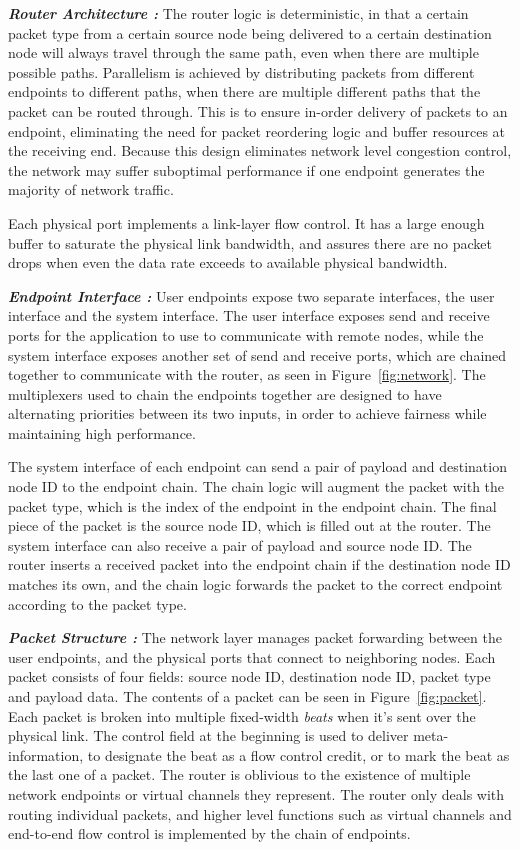 \emph{\bf{Router Architecture :}}
The router logic is deterministic, in that a certain packet type from a certain
source node being delivered to a certain destination node will always travel
through the same path, even when there are multiple possible paths. Parallelism
is achieved by distributing packets from different endpoints to different paths,
when there are multiple different paths that the packet can be routed through.
This is to ensure in-order delivery of packets to an endpoint, eliminating the
need for packet reordering logic and buffer resources at the receiving end.
Because this design eliminates network level congestion control, the network may
suffer suboptimal performance if one endpoint generates the majority of network
traffic.

Each physical port implements a link-layer flow control. It has a large enough
buffer to saturate the physical link bandwidth, and assures there are no packet
drops when even the data rate exceeds to available physical bandwidth.

\emph{\bf{Endpoint Interface :}}
User endpoints expose two
separate interfaces, the user interface and the system interface. The user
interface exposes send and receive ports for the application to use to
communicate with remote nodes, while the system interface exposes another set of send
and receive ports, which are chained together to communicate with the router, as
seen in Figure~\ref{fig:network}.
The multiplexers used to chain the
endpoints together are designed to have alternating priorities between its two
inputs, in order to achieve fairness while maintaining high performance.

The system interface of each endpoint can send a pair of payload and destination
node ID to the endpoint chain. The chain logic will augment the packet with the
packet type, which is the index of the endpoint in the endpoint chain. The final
piece of the packet is the source node ID, which is filled out at the router.
The system interface can also receive a pair of payload and source node ID. The
router inserts a received packet into the endpoint chain if the destination node
ID matches its own, and the chain logic forwards the packet to the correct
endpoint according to the packet type.


\emph{\bf{Packet Structure :}}
The network layer manages packet forwarding between the user endpoints, and the
physical ports that connect to neighboring nodes. Each packet consists of four
fields: source node ID, destination node ID, packet type and payload data. The
contents of a packet can be seen in Figure~\ref{fig:packet}. Each packet is
broken into multiple fixed-width \textit{beats} when it's sent over the physical link.
The control field at the beginning is used to deliver meta-information, to
designate the beat as a flow control credit, or to mark the beat as the
last one of a packet.
The router is oblivious to the existence of multiple network endpoints or
virtual channels they represent. The router only deals with routing individual
packets, and higher level functions such as virtual channels and end-to-end flow
control is implemented by the chain of endpoints.

